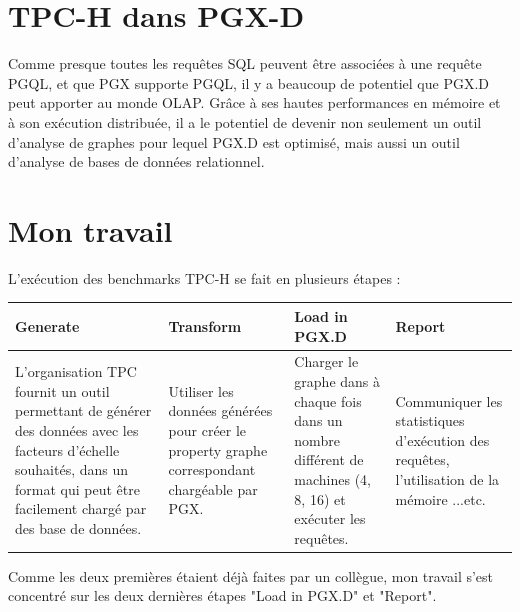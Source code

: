 \section{TPC-H dans PGX-D}

Comme presque toutes les requêtes SQL peuvent être associées à une requête PGQL, et que PGX supporte PGQL, il y a beaucoup de potentiel que PGX.D peut apporter au monde OLAP. Grâce à ses hautes performances en mémoire et à son exécution distribuée, il a le potentiel de devenir non seulement un outil d'analyse de graphes pour lequel PGX.D est optimisé, mais aussi un outil d'analyse de bases de données relationnel.

\newpage
\section{Mon travail}
L'exécution des benchmarks TPC-H se fait en plusieurs étapes :

\begin{table}[H]
\centering
\begin{tabularx}{17cm}{|X|X|X|X|}
\hline
\rowcolor[HTML]{3166FF} 
{\color[HTML]{FFFFFF} Generate} & {\color[HTML]{FFFFFF} Transform} & {\color[HTML]{FFFFFF} Load in PGX.D} & {\color[HTML]{FFFFFF} Report} \\ \hline
L'organisation TPC fournit un outil permettant de générer des données avec les facteurs d'échelle souhaités, dans un format qui peut être facilement chargé par des base de données. & Utiliser les données générées pour créer le property graphe correspondant chargéable par PGX. & Charger le graphe dans à chaque fois dans un nombre différent de machines (4, 8, 16) et exécuter les requêtes. & Communiquer les statistiques d'exécution des requêtes, l'utilisation de la mémoire ...etc. \\ \hline
\end{tabularx}
\end{table}

Comme les deux premières étaient déjà faites par un collègue, mon travail s'est concentré sur les deux dernières étapes "Load in PGX.D" et "Report".

